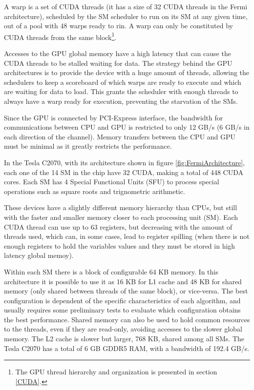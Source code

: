 A warp is a set of CUDA threads (it has a size of 32 CUDA threads in the Fermi architecture), scheduled by the SM scheduler to run on its SM at any given time, out of a pool with 48 warps ready to rin. A warp can only be constituted by CUDA threads from the same block\footnote{The GPU thread hierarchy and organization is presented in section \ref{CUDA}.}.

Accesses to the GPU global memory have a high latency that can cause the CUDA threads to be stalled waiting for data. The strategy behind the GPU architectures is to provide the device with a huge amount of threads, allowing the schedulers to keep a scoreboard of which warps are ready to execute and which are waiting for data to load. This grants the scheduler with enough threads to always have a warp ready for execution, preventing the starvation of the SMs.

Since the GPU is connected by PCI-Express interface, the bandwidth for communications between CPU and GPU is restricted to only 12 GB/s (6 GB/s in each direction of the channel). Memory transfers between the CPU and GPU must be minimal as it greatly restricts the performance.

In the Tesla C2070, with its architecture shown in figure \ref{fig:FermiArchitecture}, each one of the 14 SM in the chip have 32 CUDA, making a total of 448 CUDA cores. Each SM has 4 Special Functional Units (SFU) to process special operations such as square roots and trignometric arithmetic.

These devices have a slightly different memory hierarchy than CPUs, but still with the faster and smaller memory closer to each processing unit (SM). Each CUDA thread can use up to 63 registers, but decreasing with the amount of threads used, which can, in some cases, lead to register spilling (when there is not enough registers to hold the variables values and they must be stored in high latency global memoy).

Within each SM there is a block of configurable 64 KB memory. In this architecture it is possible to use it as 16 KB for L1 cache and 48 KB for shared memory (only shared between threads of the same block), or vice-versa. The best configuration is dependent of the specific characteristics of each algorithm, and usually requires some preliminary tests to evaluate which configuration obtains the best performance. Shared memory can also be used to hold common resources to the threads, even if they are read-only, avoiding accesses to the slower global memory. The L2 cache is slower but larger, 768 KB, shared among all SMs. The Tesla C2070 has a total of 6 GB GDDR5 RAM, with a bandwidth of 192.4 GB/s.


